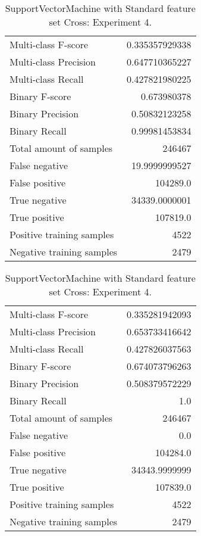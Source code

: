 \begin{table}[H]
\begin{minipage}{0.5\textwidth}
\caption{SupportVectorMachine with Standard feature set Cross: Experiment 3.}
\centering
\begin{tabular}{l r}
\toprule
Multi-class F-score & 0.335357929338 \\
Multi-class Precision & 0.647710365227 \\
Multi-class Recall & 0.427821980225 \\
\midrule
Binary F-score & 0.673980378 \\
Binary Precision & 0.50832123258 \\
Binary Recall & 0.99981453834 \\
\midrule
Total amount of samples & 246467 \\
False negative & 19.9999999527 \\
False positive & 104289.0 \\
True negative & 34339.0000001 \\
True positive & 107819.0 \\
\midrule
Positive training samples & 4522 \\
Negative training samples & 2479 \\
\bottomrule
\end{tabular}
\end{minipage}
\hfillx
\begin{minipage}{0.5\textwidth}
\caption{SupportVectorMachine with Standard feature set Cross: Experiment 4.}
\centering
\begin{tabular}{l r}
\toprule
Multi-class F-score & 0.335281942093 \\
Multi-class Precision & 0.653733416642 \\
Multi-class Recall & 0.427826037563 \\
\midrule
Binary F-score & 0.674073796263 \\
Binary Precision & 0.508379572229 \\
Binary Recall & 1.0 \\
\midrule
Total amount of samples & 246467 \\
False negative & 0.0 \\
False positive & 104284.0 \\
True negative & 34343.9999999 \\
True positive & 107839.0 \\
\midrule
Positive training samples & 4522 \\
Negative training samples & 2479 \\
\bottomrule
\end{tabular}
\end{minipage}
\end{table}
